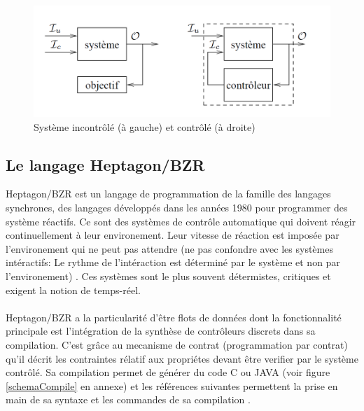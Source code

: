 \documentclass{svjour3}
\begin{document}
\begin{figure}[!h]
\includegraphics[height= 10 cm,width=15cm]{controleur.png}
 \caption{Système incontrôlé (à gauche) et contrôlé (à droite) \textit{\cite {Dumitrescu07b}}}
 \label{schemaControleur}
\end{figure}
\newpage
\subsection{Le langage Heptagon/BZR}
Heptagon/BZR est un langage de programmation de la famille des langages synchrones, des langages développés dans les années 1980 pour 
programmer des système réactifs. Ce sont des systèmes de contrôle automatique qui doivent réagir continuellement à leur environement. 
Leur vitesse de réaction est imposée par l'environement qui ne peut pas attendre (ne pas confondre avec les 
systèmes intéractifs: Le rythme de l'intéraction est déterminé par le système et non par l'environement) \cite{ref5}. Ces systèmes sont le plus souvent 
détermistes, critiques et exigent la notion de temps-réel.
\\
\\
Heptagon/BZR a la particularité d'être flots de données dont la fonctionnalité principale est l'intégration de la synthèse de contrôleurs discrets dans sa 
compilation. C'est grâce au mecanisme de contrat (programmation par contrat) qu'il décrit les contraintes rélatif aux propriétes devant être verifier par
le système contrôlé. Sa compilation permet de générer du code C ou JAVA (voir figure \ref{schemaCompile} en annexe) et les références suivantes permettent la prise
en main de sa syntaxe et les commandes de sa compilation \cite{ref6} \cite{ref7}.
\end{document}
